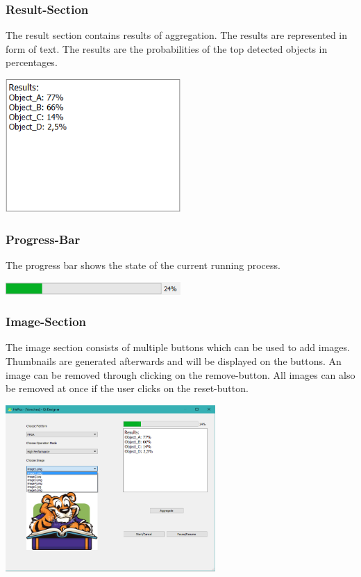 \documentclass[parskip=full]{scrartcl}
\begin{document}
\subsubsection {Result-Section}

The result section contains results of aggregation. The results are represented in form of text. The results are the probabilities of the top detected objects in percentages.

\begin{center}
\includegraphics[width=0.5\textwidth]{images/NewMainWindowResult.png}
\end{center}

\subsubsection {Progress-Bar}

The progress bar shows the state of the current running process.

\begin{center}
\includegraphics[width=0.5\textwidth]{images/NewMainWindowProgressBar.png}
\end{center}

\pagebreak



\subsubsection {Image-Section}

The image section consists of multiple buttons which can be used to add images. Thumbnails are generated afterwards and will be displayed on the buttons. An image can be removed through clicking on the remove-button. All images can also be removed at once if the user clicks on the reset-button.

\begin{center}
\includegraphics[width=0.6\textwidth]{images/NewMainWindowImage.png}
\end{center}
\end{document}
